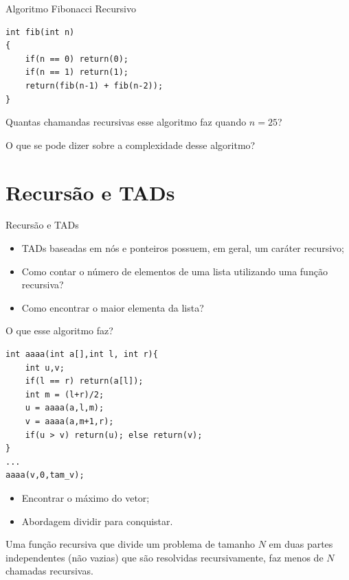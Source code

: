 \documentclass{beamer}
\begin{document}
	\begin{frame}[fragile,c]{Algoritmo Fibonacci Recursivo}
		\begin{verbatim}
int fib(int n)
{
	if(n == 0) return(0);
	if(n == 1) return(1);
	return(fib(n-1) + fib(n-2));
}
		\end{verbatim}
		\begin{center}
			Quantas chamandas recursivas esse algoritmo faz quando $n = 25$?
		\end{center}

		\begin{center}
			O que se pode dizer sobre a complexidade desse algoritmo?
		\end{center}
	\end{frame}

	\section{Recursão e TADs}

	\begin{frame}[c]{Recursão e TADs}
		\begin{itemize}
			\item TADs baseadas em nós e ponteiros possuem, em geral, um caráter recursivo;

			\item Como contar o número de elementos de uma lista utilizando uma função recursiva?

			\item Como encontrar o maior elementa da lista?
		\end{itemize}
	\end{frame}

	\begin{frame}[fragile,c]{O que esse algoritmo faz?}
		\begin{verbatim}
int aaaa(int a[],int l, int r){
	int u,v;
	if(l == r) return(a[l]);
	int m = (l+r)/2;
	u = aaaa(a,l,m);
	v = aaaa(a,m+1,r);
	if(u > v) return(u); else return(v);
}
...
aaaa(v,0,tam_v);
		\end{verbatim}

		\pause

		\begin{itemize}
			\item Encontrar o máximo do vetor;
			\item Abordagem dividir para conquistar.
		\end{itemize}

		\begin{center}
			Uma função recursiva que divide um problema de tamanho $N$ em duas partes independentes (não vazias) que são resolvidas recursivamente, faz menos de $N$ chamadas recursivas.
		\end{center}
	\end{frame}
\end{document}
